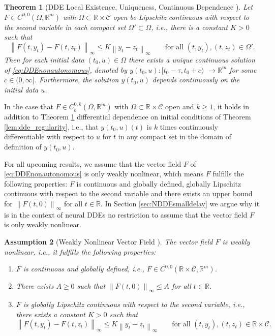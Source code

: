 \documentclass[10pt]{article}
\numberwithin{equation}{section}
\newtheorem{theorem}{Theorem}[section]
\newtheorem{assumption}[theorem]{Assumption}
\newcommand\norm[1]{\left\lVert#1\right\rVert}
\begin{document}
	\begin{theorem}[DDE Local Existence, Uniqueness, Continuous Dependence \cite{Hale1993}] \label{th:DDEexistenceuniqueness}
		Let $F\in C^{0,0}(\Omega, \mathbb{R}^m)$ with $\Omega \subset \mathbb{R}\times \mathcal{C}$ open be Lipschitz continuous with respect to the second variable in each compact set $\Omega' \subset \Omega$, i.e., there is a constant $K>0$ such that
		\begin{equation*}
			\norm{F(t,y_t)-F(t,z_t)}_\infty \leq K \norm{y_t-z_t}_\infty \qquad \text{for all } (t,y_t), (t,z_t) \in \Omega'.
		\end{equation*}
		Then for each initial data $(t_0,u) \in \Omega$ there exists a unique continuous solution  of \eqref{eq:DDEnonautonomous}, denoted by $y(t_0,u):[t_0-\tau,t_0+c)$ $\rightarrow  \mathbb{R}^m$  for some $c\in(0,\infty]$. Furthermore, the solution $y(t_0,u)$ depends continuously on the initial data $u$.
	\end{theorem}
	
	In the case that $F\in C^{0,k}_b(\Omega,\mathbb{R}^m)$ with $\Omega \subset \mathbb{R}\times \mathcal{C}$ open and $k \geq 1$, it holds in addition to Theorem \ref{th:DDEexistenceuniqueness} differential dependence on initial conditions of Theorem \ref{lem:dde_regularity}, i.e., that $y(t_0,u)(t)$ is $k$ times continuously differentiable with respect to $u$ for $t$ in any compact set in the domain of definition of $y(t_0,u)$. 
	
	For all upcoming results, we assume that the vector field $F$ of \eqref{eq:DDEnonautonomous} is only weakly nonlinear, which means $F$ fulfills the following properties: $F$ is continuous and globally defined,  globally Lipschitz continuous with respect to the second variable and there exists an upper bound for $\norm{F(t,0)}_\infty $ for all $t \in \mathbb{R}$. In Section \ref{sec:NDDEsmalldelay} we argue why it is in the context of neural DDEs no restriction to assume that the vector field $F$ is only weakly nonlinear.
	
	\begin{assumption}[Weakly Nonlinear Vector Field \cite{Driver1968}] \label{ass:weaklynonlinear}
		The vector field $F$ is weakly nonlinear, i.e., it fulfills the following properties:
		\begin{enumerate}[label=(\alph*), font=\normalfont]
			\item $F$ is continuous and globally defined, i.e., $F\in C^{0,0}(\mathbb{R}\times \mathcal{C}, \mathbb{R}^m)$.
			\item There exists $A \geq 0$ such that $\norm{F(t,0)}_\infty \leq A $ for all $t \in \mathbb{R}$.
			\item $F$ is globally Lipschitz continuous with respect to the second variable, i.e., there exists a constant $K>0$ such that
			\begin{equation*}
				\norm{F(t,y_t)-F(t,z_t)}_\infty \leq K \norm{y_t-z_t}_\infty \qquad \text{for all } (t,y_t), (t,z_t) \in \mathbb{R} \times \mathcal{C}.
			\end{equation*}
		\end{enumerate}
	\end{assumption}
	
\end{document}
